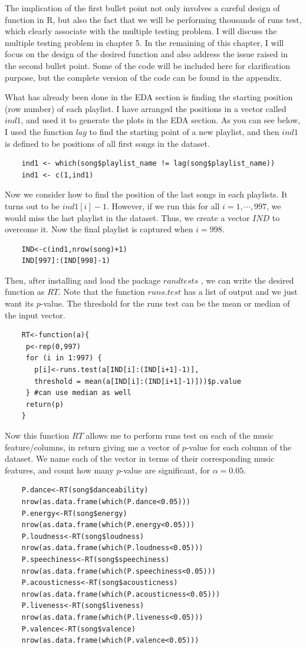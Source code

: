 \documentclass[12pt]{article}
\theoremstyle{plain}
\theoremstyle{definition}
\theoremstyle{remark}
\begin{document}
The implication of the first bullet point not only involves a careful design of function in R, but also the fact that we will be performing thousands of runs test, which clearly associate with the multiple testing problem. I will discuss the multiple testing problem in chapter 5. In the remaining of this chapter, I will focus on the design of the desired function and also address the issue raised in the second bullet point. Some of the code will be included here for clarification purpose, but the complete version of the code can be found in the appendix.

What has already been done in the EDA section is finding the starting position (row number) of each playlist. I have arranged the positions in a vector called $ind1$, and used it to generate the plots in the EDA section. As you can see below, I used the function $lag$ to find the starting point of a new playlist, and then $ind1$ is defined to be positions of all first songs in the dataset.
\begin{verbatim}
    ind1 <- which(song$playlist_name != lag(song$playlist_name))
    ind1 <- c(1,ind1)
\end{verbatim}
Now we consider how to find the position of the last songs in each playlists. It turns out to be $ind1[i]-1$. However, if we run this for all $i=1, \cdots, 997$, we would miss the last playlist in the dataset. Thus, we create a vector $IND$ to overcome it. Now the final playlist is captured when $i=998$. 
\begin{verbatim}
    IND<-c(ind1,nrow(song)+1)
    IND[997]:(IND[998]-1)
\end{verbatim}
Then, after installing and load the package $randtests$ \cite{3.7}, we can write the desired function as $RT$. Note that the function $runs.test$ has a list of output and we just want its $p$-value. The threshold for the runs test can be the mean or median of the input vector.
\begin{verbatim}
    RT<-function(a){
     p<-rep(0,997)
     for (i in 1:997) {
       p[i]<-runs.test(a[IND[i]:(IND[i+1]-1)],
       threshold = mean(a[IND[i]:(IND[i+1]-1)]))$p.value
     } #can use median as well
     return(p)
    }
\end{verbatim}

Now this function $RT$ allows me to perform runs test on each of the music feature/columns, in return giving me a vector of $p$-value for each column of the dataset. We name each of the vector in terms of their corresponding music features, and count how many $p$-value are significant, for $\alpha=0.05$.
\begin{verbatim}
    P.dance<-RT(song$danceability)
    nrow(as.data.frame(which(P.dance<0.05)))
    P.energy<-RT(song$energy)
    nrow(as.data.frame(which(P.energy<0.05)))
    P.loudness<-RT(song$loudness)
    nrow(as.data.frame(which(P.loudness<0.05)))
    P.speechiness<-RT(song$speechiness)
    nrow(as.data.frame(which(P.speechiness<0.05)))
    P.acousticness<-RT(song$acousticness)
    nrow(as.data.frame(which(P.acousticness<0.05)))
    P.liveness<-RT(song$liveness)
    nrow(as.data.frame(which(P.liveness<0.05)))
    P.valence<-RT(song$valence)
    nrow(as.data.frame(which(P.valence<0.05)))
\end{verbatim}
\end{document}
